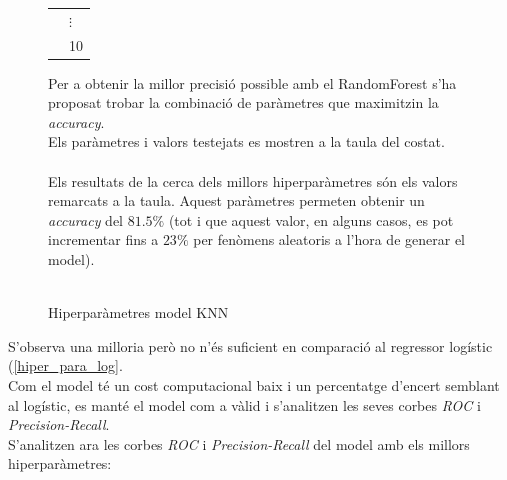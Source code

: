 \documentclass[a4paper, 11pt]{article}
\begin{document}
\begin{figure}[h]
\begin{minipage}{8cm}
\begin{center}
\begin{tabular}{l|l}
        & $\vdots$\\
        & 10\\
    \end{tabular}
    \caption{Hiperparàmetres model KNN}
    \label{tab:afins}
\end{center}
\end{minipage} %
\hspace{2em}
\begin{minipage}{6.5cm} %
Per a obtenir la millor precisió possible amb el RandomForest s'ha proposat trobar la combinació de paràmetres que maximitzin la \textit{accuracy}.\\ Els paràmetres i valors testejats es mostren a la taula del costat.\\\\
Els resultats de la cerca dels millors hiperparàmetres són els valors remarcats a la taula. Aquest paràmetres permeten obtenir un \textit{accuracy} del $81.5\%$ (tot i que aquest valor, en alguns casos, es pot incrementar fins a $23\%$ per fenòmens aleatoris a l'hora de generar el model).\\\\ 

\end{minipage} %
\end{figure} %
\hspace{-1.6em}S'observa una milloria però no n'és suficient en comparació al regressor logístic (\textcolor{blue}{\ref{hiper_para_log}}.\\
Com el model té un cost computacional baix i un percentatge d'encert semblant al logístic, es manté el model com a vàlid i s'analitzen les seves corbes \textit{ROC} i \textit{Precision-Recall}.\\
\hspace{-1.6em}S'analitzen ara les corbes \textit{ROC} i \textit{Precision-Recall} del model amb els millors hiperparàmetres:\\
\newpage
\end{document}
